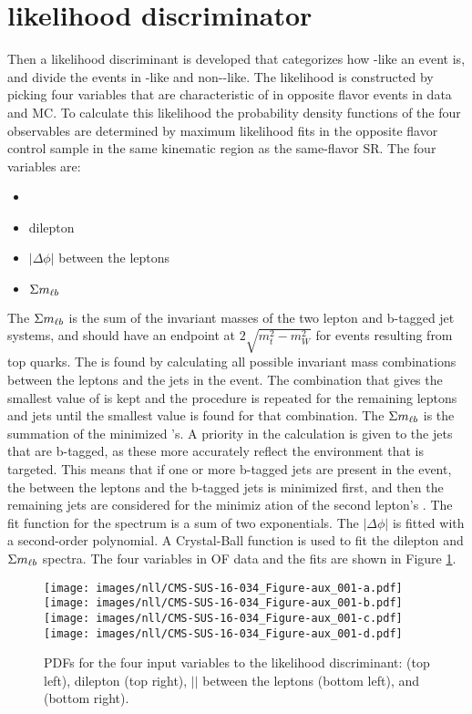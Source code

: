 \section{\ttbar likelihood discriminator}\label{sec:ttbarlikelihood}
\noindent
\justify
Then a likelihood discriminant is developed that categorizes how \ttbar-like an event is, and divide the events in \ttbar-like and non-\ttbar-like.
The \ttbar likelihood is constructed by picking four variables that are characteristic of \ttbar in opposite flavor events in data and MC.
To calculate this likelihood the probability density functions of the four observables are determined by maximum likelihood fits in the opposite flavor control sample in the same kinematic region as the same-flavor SR.
The four variables are:
\begin{itemize}
\item \ptmiss
\item dilepton \pt
\item $|\Delta\phi|$ between the leptons
\item $\Sigma m_{\ell b}$
\end{itemize}
The $\Sigma m_{\ell b}$ is the sum of the invariant masses of the two lepton and b-tagged jet systems, and should have an endpoint at $2\sqrt{m_{t}^{2}-m_{W}^{2}}$ for events resulting from top quarks.
The \mlb is found by calculating all possible invariant mass combinations between the leptons and the jets in the event.
The combination that gives the smallest value of \mlb is kept and the procedure is repeated for the remaining leptons and jets until the smallest value is found for that combination.
The $\Sigma m_{\ell b}$ is the summation of the minimized \mlb's.
A priority in the calculation is given to the jets that are b-tagged, as these more accurately reflect the \ttbar environment that is targeted.
This means that if one or more b-tagged jets are present in the event, the \mlb between the leptons and the b-tagged jets is minimized first, and then the remaining jets are considered for the minimiz    ation of the second lepton’s \mlb.
The fit function for the \ptmiss spectrum is a sum of two exponentials. The $|\Delta\phi|$ is fitted with a second-order polynomial.
A Crystal-Ball function is used to fit the dilepton \pt and $\Sigma m_{\ell b}$ spectra.
The four variables in OF data and the fits are shown in Figure \ref{fig:pdfsNLL}.
\begin{figure}[htbp!] 
\begin{center}
    \texttt{[image: images/nll/CMS-SUS-16-034\_Figure-aux\_001-a.pdf]}
    \texttt{[image: images/nll/CMS-SUS-16-034\_Figure-aux\_001-b.pdf]} \\
    \texttt{[image: images/nll/CMS-SUS-16-034\_Figure-aux\_001-c.pdf]} 
    \texttt{[image: images/nll/CMS-SUS-16-034\_Figure-aux\_001-d.pdf]}
    \caption{PDFs for the four input variables to the likelihood discriminant: \ptmiss (top left), dilepton \pt (top right),
    $|$\dphi$|$ between the leptons (bottom left), and \mlb (bottom right).}
\label{fig:pdfsNLL}
\end{center}
\end{figure}
